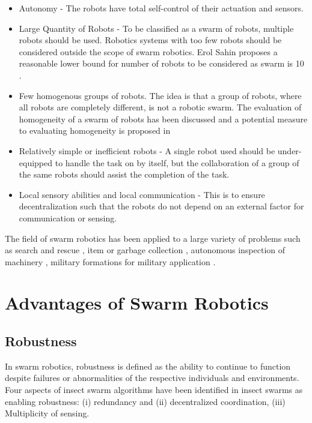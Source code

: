 \begin{itemize}
\item Autonomy - The robots have total self-control of their actuation and sensors. 
\item Large Quantity of Robots - To be classified as a swarm of robots, multiple robots should be used. Robotics systems with too few robots should be considered outside the scope of swarm robotics. Erol Sahin proposes a reasonable lower bound for number of robots to be considered as swarm is 10 \cite{csahin2005swarm}.
\item Few homogenous groups of robots. The idea is that a group of robots, where all robots are completely different, is not a robotic swarm. The evaluation of homogeneity of a swarm of robots has been discussed and a potential measure to evaluating homogeneity is proposed in \cite{balch2000hierarchic}
\item Relatively simple or inefficient robots - A single robot used should be under-equipped to handle the task on by itself, but the collaboration of a group of the same robots should assist the completion of the task.  
\item Local sensory abilities and local communication - This is to ensure decentralization such that the robots do not depend on an external factor for communication or sensing. 
\end{itemize}

 The field of swarm robotics has been applied to a large variety of problems such as search and rescue \cite{mondada2002search}, item or garbage collection \cite{balch1995io}, autonomous inspection of machinery \cite{correll2007challenging}, military formations for military application \cite{balch1998behavior}.



\section{Advantages of Swarm Robotics}
\label{sec:first:advantages}

\subsection{Robustness}
\label{robustness}

In swarm robotics, robustness is defined as the ability to continue to function despite failures or abnormalities of the respective individuals and environments. Four aspects of insect swarm algorithms have been identified  in insect swarms as enabling robustness: (i) redundancy and (ii) decentralized coordination, (iii) Multiplicity of sensing.

